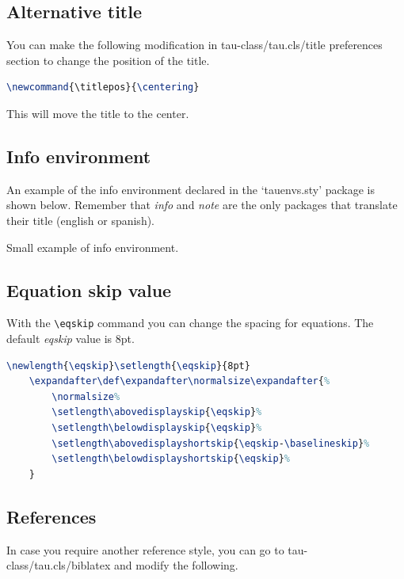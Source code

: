 \documentclass[9pt,a4paper,twoside]{tau-class/tau}
\begin{document}
    \subsection{Alternative title}

        You can make the following modification in tau-class/tau.cls/title preferences section to change the position of the title.

\nolinenumbers
\begin{lstlisting}[language=TeX, caption=Alternative title.]
\newcommand{\titlepos}{\centering}
\end{lstlisting}
\linenumbers

	This will move the title to the center. 

    \subsection{Info environment}

        An example of the info environment declared in the ‘tauenvs.sty’ package is shown below. Remember that \textit{info} and \textit{note} are the only packages that translate their title (english or spanish).
		
	\begin{info}
		Small example of info environment.
	\end{info}

    \subsection{Equation skip value}

        With the \verb|\eqskip| command you can change the spacing for equations. The default \textit{eqskip} value is 8pt.

\nolinenumbers
\begin{lstlisting}[language=TeX, caption=Equation skip code.]
	\newlength{\eqskip}\setlength{\eqskip}{8pt}
	\expandafter\def\expandafter\normalsize\expandafter{%
		\normalsize%
		\setlength\abovedisplayskip{\eqskip}%
		\setlength\belowdisplayskip{\eqskip}%
		\setlength\abovedisplayshortskip{\eqskip-\baselineskip}%
		\setlength\belowdisplayshortskip{\eqskip}%
	}
\end{lstlisting}
\linenumbers
		
    \subsection{References}
		
        In case you require another reference style, you can go to tau-class/tau.cls/biblatex and modify the following.
		
\end{document}
